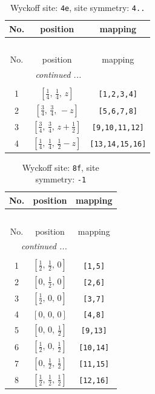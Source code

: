 \documentclass[fleqn,8pt]{jsarticle}
\begin{document}
\renewcommand{\arraystretch}{1.2}
\begin{longtable}{ccc}
\caption{Wyckoff site: {\tt 4e}, site symmetry: {\tt 4..}}
 \\
 \hline \hline
No. & position & mapping \\ \hline \endfirsthead

\multicolumn{2}{l}{\tablename\ \thetable{}} \\
 \hline \hline
No. & position & mapping \\ \hline \endhead

 \hline \hline
\multicolumn{2}{r}{\footnotesize\it continued ...} \\ \endfoot

 \hline \hline
\multicolumn{2}{r}{} \\ \endlastfoot

1 & $\left[ \frac{1}{4},\, \frac{1}{4},\, z \right]$ & {\tt [1,2,3,4]} \\ \hline
2 & $\left[ \frac{3}{4},\, \frac{3}{4},\, - z \right]$ & {\tt [5,6,7,8]} \\ \hline
3 & $\left[ \frac{3}{4},\, \frac{3}{4},\, z + \frac{1}{2} \right]$ & {\tt [9,10,11,12]} \\ \hline
4 & $\left[ \frac{1}{4},\, \frac{1}{4},\, \frac{1}{2} - z \right]$ & {\tt [13,14,15,16]} \\
\end{longtable}
\renewcommand{\arraystretch}{1.2}
\begin{longtable}{ccc}
\caption{Wyckoff site: {\tt 8f}, site symmetry: {\tt -1}}
 \\
 \hline \hline
No. & position & mapping \\ \hline \endfirsthead

\multicolumn{2}{l}{\tablename\ \thetable{}} \\
 \hline \hline
No. & position & mapping \\ \hline \endhead

 \hline \hline
\multicolumn{2}{r}{\footnotesize\it continued ...} \\ \endfoot

 \hline \hline
\multicolumn{2}{r}{} \\ \endlastfoot

1 & $\left[ \frac{1}{2},\, \frac{1}{2},\, 0 \right]$ & {\tt [1,5]} \\ \hline
2 & $\left[ 0,\, \frac{1}{2},\, 0 \right]$ & {\tt [2,6]} \\ \hline
3 & $\left[ \frac{1}{2},\, 0,\, 0 \right]$ & {\tt [3,7]} \\ \hline
4 & $\left[ 0,\, 0,\, 0 \right]$ & {\tt [4,8]} \\ \hline
5 & $\left[ 0,\, 0,\, \frac{1}{2} \right]$ & {\tt [9,13]} \\ \hline
6 & $\left[ \frac{1}{2},\, 0,\, \frac{1}{2} \right]$ & {\tt [10,14]} \\ \hline
7 & $\left[ 0,\, \frac{1}{2},\, \frac{1}{2} \right]$ & {\tt [11,15]} \\ \hline
8 & $\left[ \frac{1}{2},\, \frac{1}{2},\, \frac{1}{2} \right]$ & {\tt [12,16]} \\
\end{longtable}
\end{document}
